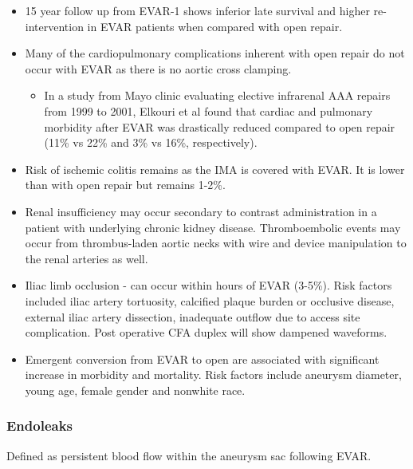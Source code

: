 \documentclass[
]{book}
\providecommand{\tightlist}{%
  \setlength{\itemsep}{0pt}\setlength{\parskip}{0pt}}
\begin{document}
\begin{itemize}
\item
  15 year follow up from EVAR-1 shows inferior late survival and
  higher re-intervention in EVAR patients when compared with open
  repair. \citep{patelEndovascularOpenRepair2016}
\item
  Many of the cardiopulmonary complications inherent with open repair
  do not occur with EVAR as there is no aortic cross clamping.

  \begin{itemize}
  \tightlist
  \item
    In a study from Mayo clinic evaluating elective infrarenal AAA
    repairs from 1999 to 2001, Elkouri et al found that cardiac and
    pulmonary morbidity after EVAR was drastically reduced compared
    to open repair (11\% vs 22\% and 3\% vs 16\%, respectively).
    \citep{elkouriPerioperativeComplicationsEarly2004}
  \end{itemize}
\item
  Risk of ischemic colitis remains as the IMA is covered with EVAR. It
  is lower than with open repair but remains 1-2\%.
\item
  Renal insufficiency may occur secondary to contrast administration
  in a patient with underlying chronic kidney disease. Thromboembolic
  events may occur from thrombus-laden aortic necks with wire and
  device manipulation to the renal arteries as well.
\item
  Iliac limb occlusion - can occur within hours of EVAR (3-5\%). Risk
  factors included iliac artery tortuosity, calcified plaque burden or
  occlusive disease, external iliac artery dissection\citep{vacirca2019},
  inadequate outflow due to access site complication. Post operative
  CFA duplex will show dampened waveforms.\citep{greenhalgh2010, taudorf2014}
\item
  Emergent conversion from EVAR to open are associated with
  significant increase in morbidity and mortality. Risk factors
  include aneurysm diameter, young age, female gender and nonwhite
  race.\citep{ultee2016}
\end{itemize}

\hypertarget{endoleaks}{%
\subsubsection{Endoleaks}\label{endoleaks}}

Defined as persistent blood flow within the aneurysm sac following EVAR.
\end{document}
